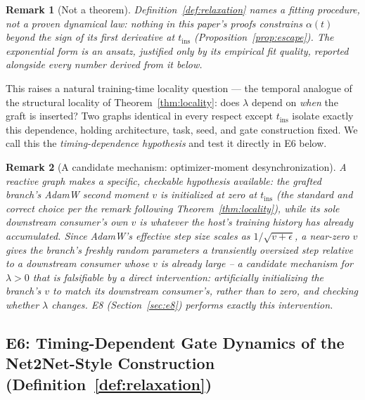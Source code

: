 \documentclass[11pt,a4paper]{article}
\newtheorem{remark}{Remark}
\begin{document}
\begin{remark}[Not a theorem]
Definition~\ref{def:relaxation} names a fitting procedure, not a proven dynamical law: nothing in
this paper's proofs constrains $\alpha(t)$ beyond the sign of its first derivative at
$t_{\mathrm{ins}}$ (Proposition~\ref{prop:escape}). The exponential form is an ansatz, justified
only by its empirical fit quality, reported alongside every number derived from it below.
\end{remark}

This raises a natural training-time locality question --- the temporal analogue of the structural
locality of Theorem~\ref{thm:locality}: does $\lambda$ depend on \emph{when} the graft is inserted?
Two graphs identical in every respect except
$t_{\mathrm{ins}}$ isolate exactly this dependence, holding architecture, task, seed, and gate
construction fixed. We call this the \emph{timing-dependence hypothesis} and test it directly in
E6 below.

\begin{remark}[A candidate mechanism: optimizer-moment desynchronization]
\label{rem:desync-hypothesis}
A reactive graph makes a specific, checkable hypothesis available: the grafted branch's AdamW
second moment $v$ is initialized at zero at $t_{\mathrm{ins}}$ (the standard and correct choice per
the remark following Theorem~\ref{thm:locality}), while its sole downstream consumer's own $v$ is
whatever the host's training history has already accumulated. Since AdamW's effective step size
scales as $1/\sqrt{v+\epsilon}$, a near-zero $v$ gives the branch's freshly random parameters a
transiently oversized step relative to a downstream consumer whose $v$ is already large -- a
candidate mechanism for $\lambda>0$ that is falsifiable by a direct intervention: artificially
initializing the branch's $v$ to match its downstream consumer's, rather than to zero, and checking
whether $\lambda$ changes. E8 (Section~\ref{sec:e8}) performs exactly this intervention.
\end{remark}

\subsection{E6: Timing-Dependent Gate Dynamics of the Net2Net-Style Construction (Definition~\ref{def:relaxation})}
\label{sec:e6}
\end{document}
